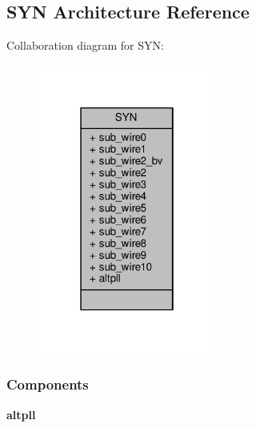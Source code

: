 \subsection{S\+YN Architecture Reference}
\label{classddr2__phy__alt__mem__phy__pll_1_1SYN}


Collaboration diagram for S\+YN\+:\nopagebreak
\begin{figure}[H]
\begin{center}
\leavevmode
\includegraphics[width=166pt]{de/d7f/classddr2__phy__alt__mem__phy__pll_1_1SYN__coll__graph}
\end{center}
\end{figure}
\subsubsection*{Components}
 \begin{DoxyCompactItemize}
\item 
{\bf altpll}  {\bfseries }  
\end{DoxyCompactItemize}
